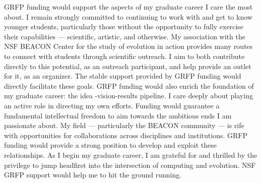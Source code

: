 GRFP funding would support the aspects of my graduate career I care the most about.
I remain strongly committed to continuing to work with and get to know younger students, particularly those without the opportunity to fully exercise their capabilities --- scientific, artistic, and otherwise.
My association with the NSF BEACON Center for the study of evolution in action provides many routes to connect with students through scientific outreach.
I aim to both contribute directly to this potential, as an outreach participant, and help provide an outlet for it, as an organizer.
The stable support provided by GRFP funding would directly facilitate these goals.
GRFP funding would also enrich the foundation of my graduate career: the idea -vision-results pipeline.
I care deeply about playing an active role in directing my own efforts.
Funding would guarantee a fundamental intellectual freedom to aim towards the ambitious ends I am passionate about.
My field --- particularly the BEACON community --- is rife with opportunities for collaborations across disciplines and institutions.
GRFP funding would provide a strong position to develop and exploit these relationships.
As I begin my graduate career, I am grateful for and thrilled by the privilege to jump headfirst into the intersection of computing and evolution.
NSF GRFP support would help me to hit the ground running.
